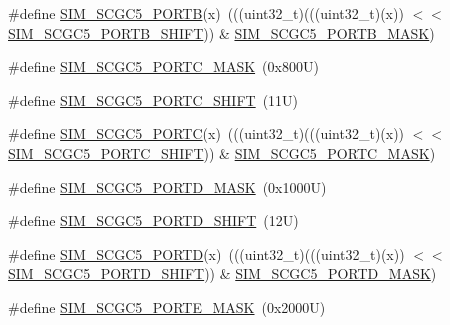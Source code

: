 \begin{DoxyCompactItemize}
\item 
\#define \mbox{\hyperlink{group___s_i_m___register___masks_gaf3bc60a4a7ab6d478a550ccee752f98d}{S\+I\+M\+\_\+\+S\+C\+G\+C5\+\_\+\+P\+O\+R\+TB}}(x)~(((uint32\+\_\+t)(((uint32\+\_\+t)(x)) $<$$<$ \mbox{\hyperlink{group___s_i_m___register___masks_ga491c4800f5437a9e2d235a77819e434d}{S\+I\+M\+\_\+\+S\+C\+G\+C5\+\_\+\+P\+O\+R\+T\+B\+\_\+\+S\+H\+I\+FT}})) \& \mbox{\hyperlink{group___s_i_m___register___masks_ga5509cf72c7508dd77f0a1a9e631943e8}{S\+I\+M\+\_\+\+S\+C\+G\+C5\+\_\+\+P\+O\+R\+T\+B\+\_\+\+M\+A\+SK}})
\item 
\#define \mbox{\hyperlink{group___s_i_m___register___masks_gaac31449d101ad0d05f2bed682571be35}{S\+I\+M\+\_\+\+S\+C\+G\+C5\+\_\+\+P\+O\+R\+T\+C\+\_\+\+M\+A\+SK}}~(0x800\+U)
\item 
\#define \mbox{\hyperlink{group___s_i_m___register___masks_gae141a6d4af583e7410d0120442b1012f}{S\+I\+M\+\_\+\+S\+C\+G\+C5\+\_\+\+P\+O\+R\+T\+C\+\_\+\+S\+H\+I\+FT}}~(11\+U)
\item 
\#define \mbox{\hyperlink{group___s_i_m___register___masks_gac46313896b39db20c797f777ecb4efa6}{S\+I\+M\+\_\+\+S\+C\+G\+C5\+\_\+\+P\+O\+R\+TC}}(x)~(((uint32\+\_\+t)(((uint32\+\_\+t)(x)) $<$$<$ \mbox{\hyperlink{group___s_i_m___register___masks_gae141a6d4af583e7410d0120442b1012f}{S\+I\+M\+\_\+\+S\+C\+G\+C5\+\_\+\+P\+O\+R\+T\+C\+\_\+\+S\+H\+I\+FT}})) \& \mbox{\hyperlink{group___s_i_m___register___masks_gaac31449d101ad0d05f2bed682571be35}{S\+I\+M\+\_\+\+S\+C\+G\+C5\+\_\+\+P\+O\+R\+T\+C\+\_\+\+M\+A\+SK}})
\item 
\#define \mbox{\hyperlink{group___s_i_m___register___masks_ga723a55222eb5f8fd25da5c956aa50e7b}{S\+I\+M\+\_\+\+S\+C\+G\+C5\+\_\+\+P\+O\+R\+T\+D\+\_\+\+M\+A\+SK}}~(0x1000\+U)
\item 
\#define \mbox{\hyperlink{group___s_i_m___register___masks_gad5f267781fcedf0fcdc0c4d3607c10cb}{S\+I\+M\+\_\+\+S\+C\+G\+C5\+\_\+\+P\+O\+R\+T\+D\+\_\+\+S\+H\+I\+FT}}~(12\+U)
\item 
\#define \mbox{\hyperlink{group___s_i_m___register___masks_ga2dc18f9c3310f4bc0857d652fc5a0cfb}{S\+I\+M\+\_\+\+S\+C\+G\+C5\+\_\+\+P\+O\+R\+TD}}(x)~(((uint32\+\_\+t)(((uint32\+\_\+t)(x)) $<$$<$ \mbox{\hyperlink{group___s_i_m___register___masks_gad5f267781fcedf0fcdc0c4d3607c10cb}{S\+I\+M\+\_\+\+S\+C\+G\+C5\+\_\+\+P\+O\+R\+T\+D\+\_\+\+S\+H\+I\+FT}})) \& \mbox{\hyperlink{group___s_i_m___register___masks_ga723a55222eb5f8fd25da5c956aa50e7b}{S\+I\+M\+\_\+\+S\+C\+G\+C5\+\_\+\+P\+O\+R\+T\+D\+\_\+\+M\+A\+SK}})
\item 
\#define \mbox{\hyperlink{group___s_i_m___register___masks_ga3d5e3e51d345fe424a4f24aa9ae73dc1}{S\+I\+M\+\_\+\+S\+C\+G\+C5\+\_\+\+P\+O\+R\+T\+E\+\_\+\+M\+A\+SK}}~(0x2000\+U)
$$
\end{DoxyCompactItemize}

